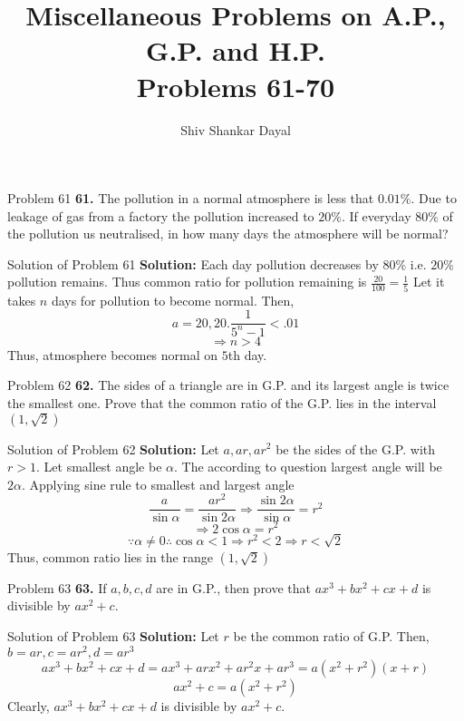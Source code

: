 \documentclass[aspectratio=1610,8pt]{beamer}
\title{Miscellaneous Problems on A.P., G.P. and H.P.\\Problems 61-70}
\author[Shiv Shankar Dayal]{Shiv Shankar Dayal}
\begin{document}
\begin{frame}
  \titlepage
\end{frame}
\begin{frame}{Problem 61}
  \textbf{61.} The pollution in a normal atmosphere is less that $0.01\%.$ Due to leakage of gas from a factory the pollution
  increased to $20\%.$ If everyday $80\%$ of the pollution us neutralised, in how many days the atmosphere will be normal?
\end{frame}
\begin{frame}{Solution of Problem 61}
  \textbf{Solution:} Each day pollution decreases by $80\%$ i.e. $20\%$ pollution remains. Thus common ratio for pollution
  remaining is $\frac{20}{100} = \frac{1}{5}$
  \linebreak\linebreak
  Let it takes $n$ days for pollution to become normal. Then,
  $$a = 20, 20.\frac{1}{5^n - 1} < .01$$
  $$\Rightarrow n > 4$$
  Thus, atmosphere becomes normal on $5$th day.
\end{frame}
\begin{frame}{Problem 62}
  \textbf{62.} The sides of a triangle are in G.P. and its largest angle is twice the smallest one. Prove that the common ratio of
  the G.P. lies in the interval $(1, \sqrt{2})$
\end{frame}
\begin{frame}{Solution of Problem 62}
  \textbf{Solution:} Let $a, ar, ar^2$ be the sides of the G.P. with $r > 1.$ Let smallest angle be $\alpha.$ The according to
  question largest angle will be $2\alpha.$ Applying sine rule to smallest and largest angle
  $$\frac{a}{\sin\alpha} = \frac{ar^2}{\sin2\alpha}\Rightarrow \frac{\sin2\alpha}{\sin\alpha} = r^2$$
  $$\Rightarrow 2\cos \alpha = r^2$$
  $$\because \alpha\neq 0 \therefore \cos\alpha < 1 \Rightarrow r^2 < 2 \Rightarrow r < \sqrt{2}$$
  Thus, common ratio lies in the range $(1, \sqrt{2})$
\end{frame}
\begin{frame}{Problem 63}
  \textbf{63.} If $a, b, c, d$ are in G.P., then prove that $ax^3 + bx^2 + cx + d$ is divisible by $ax^2 + c.$
\end{frame}
\begin{frame}{Solution of Problem 63}
  \textbf{Solution:} Let $r$ be the common ratio of G.P. Then, $b = ar, c = ar^2, d = ar^3$
  $$ax^3 + bx^2 + cx + d = ax^3 + arx^2 + ar^2x + ar^3 = a(x^2 + r^2)(x + r)$$
  $$ax^2 + c = a(x^2 + r^2)$$
  Clearly, $ax^3 + bx^2 + cx + d$ is divisible by $ax^2 + c.$
\end{frame}
\end{document}

